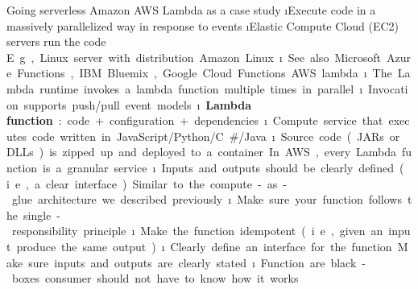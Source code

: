 \begin{frame}{Going serverless}
Amazon AWS Lambda as a case study
\i Execute code in a massively parallelized way in response to events
\i Elastic Compute Cloud (EC2) servers run the code
\si E.g., Linux server with distribution
Amazon Linux
\i See also Microsoft Azure Functions, IBM Bluemix, Google Cloud Functions

AWS lambda
\i The Lambda runtime invokes a lambda function multiple times in parallel
\i Invocation supports push/pull event models
\i \textbf{Lambda function}: code + configuration + dependencies
\i Compute service that executes code written in JavaScript/Python/C\#/Java
\i Source code (JARs or DLLs) is zipped up and deployed to a container

In AWS, every Lambda function is a granular service
\i Inputs and outputs should be clearly defined (i.e., a clear interface)
\si Similar to the compute-as-glue architecture we described previously
\i Make sure your function follows the single-responsibility principle
\i Make the function idempotent (i.e., given an input produce the same output)
\i Clearly define an interface for the function
\si Make sure inputs and outputs are clearly stated
\i Function are black-boxes
\si consumer should not have to know how it works

\end{frame}


